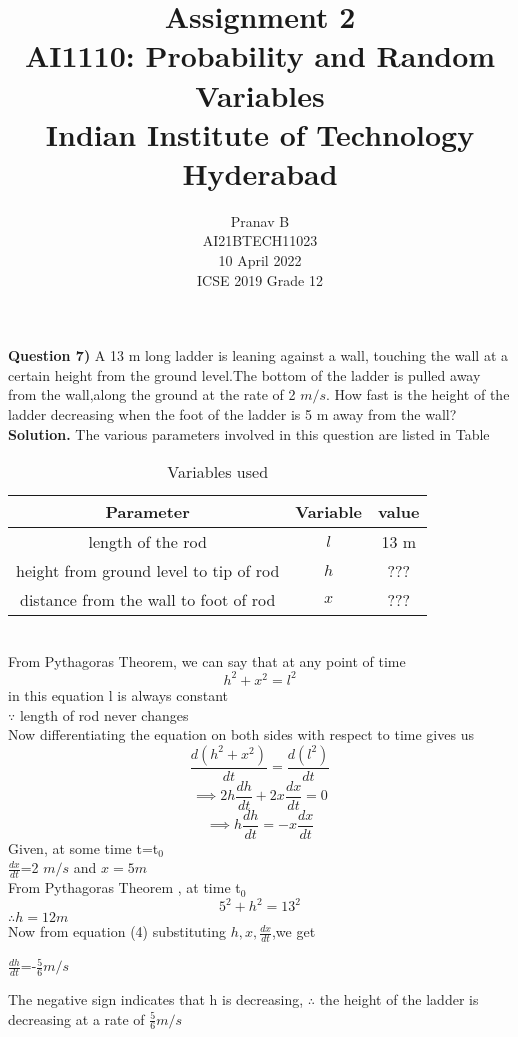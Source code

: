 \documentclass[journal,12pt,twocolumn]{IEEEtran}
\title{Assignment 2 \\ \Large AI1110: Probability and Random Variables \\ \large Indian Institute of Technology Hyderabad}
\author{Pranav B \\ \normalsize AI21BTECH11023 \\ \vspace*{20pt} \normalsize  10 April 2022 \\ \vspace*{20pt} \Large ICSE 2019 Grade 12}
\begin{document}
	\maketitle
	
	\textbf{Question 7)} 
	A 13 m long ladder is leaning against a wall, touching the wall at a certain height from the ground level.The bottom of the ladder is pulled away from the wall,along the ground at the rate of 2 $m/s$. How fast is the height of the ladder decreasing when the foot of the ladder is 5 m away from the wall?\\
	\textbf{Solution.}
	The various parameters involved in this question are listed in Table \begin{table}[h]
\caption{Variables used}
\begin{tabular}{|c|c|c|}
\hline
Parameter & Variable & value\\
\hline
length of the rod & $l$ & 13 m\\
\hline
height from ground level to tip of rod & $h$ & ???\\
\hline
distance from the wall to foot of rod & $x$ &???\\
\hline
\end{tabular}
\end{table}
\\
From Pythagoras Theorem, we can say that at any point of time\\
\begin{equation}
h^2+x^2=l^2
\end{equation}
in this equation l is always constant\\
 $\because$ length of rod never changes\\
 Now differentiating the equation on both sides with respect to time gives us\\
 \begin{equation}
 \frac{d(h^2+x^2)}{dt}=\frac{d(l^2)}{dt}
 \end{equation}
 \begin{equation}
  \implies 2h\frac{dh}{dt}+2x\frac{dx}{dt}=0
 \end{equation}
 \begin{equation}
 \implies h\frac{dh}{dt}=-x\frac{dx}{dt}
 \end{equation}
 Given, at some time t=t$_0$\\
  $\frac{dx}{dt}$=2 $m/s$ and $x= 5 m$\\
  From Pythagoras Theorem , at time t$_0$
  \begin{equation}
  5^2+h^2=13^2
  \end{equation}
  $\therefore h= 12 m$\\
  Now from equation (4) substituting $h,x,\frac{dx}{dt}$,we get\\
  \begin{center}
   $\frac{dh}{dt}$=-$\frac{5}{6} m/s$
\end{center}  
The negative sign indicates that h is decreasing,
$\therefore$ the height of the ladder is decreasing at a rate of $\frac{5}{6} m/s$
\end{document}
